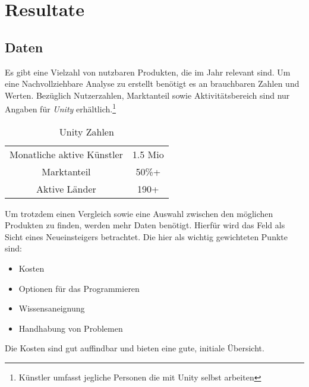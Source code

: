 \chapter{Resultate}
\label{chap:resultate}

\section{Daten}
\par Es gibt eine Vielzahl von nutzbaren Produkten, die im Jahr \the\year relevant sind. Um eine Nachvollziehbare Analyse zu erstellt benötigt es an brauchbaren Zahlen und Werten. Bezüglich Nutzerzahlen, Marktanteil sowie Aktivitätsbereich sind nur Angaben für \emph{Unity} erhältlich.\footnote{Künstler umfasst jegliche Personen die mit Unity selbst arbeiten}

\begin{table}[h]
	\centering
	\caption[Unity Zahlen]{Unity Zahlen\cite{unity_unity_2021}}
	\label{tab:unityzahlen}
	\begin{tabular}{c|c}
		\toprule
		Monatliche aktive Künstler	& 1.5 Mio\\
		Marktanteil & 50\%+ \\
		Aktive Länder & 190+ \\
		\bottomrule 
	\end{tabular}
\end{table}


\par Um trotzdem einen Vergleich sowie eine Auswahl zwischen den möglichen Produkten zu finden, werden mehr Daten benötigt. Hierfür wird das Feld als Sicht eines Neueinsteigers betrachtet. Die hier als wichtig gewichteten Punkte sind:

\begin{itemize}
	\item Kosten
	\item Optionen für das Programmieren
	\item Wissensaneignung
	\item Handhabung von Problemen
\end{itemize}

\newpage

Die Kosten sind gut auffindbar und bieten eine gute, initiale Übersicht.

